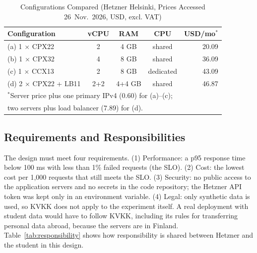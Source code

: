 \documentclass[conference,a4paper]{IEEEtran}
\begin{document}
\begin{table}[htbp]
	\caption{Configurations Compared (Hetzner Helsinki, Prices Accessed 26~Nov.~2026, USD, excl. VAT)}
	\label{tab:alternatives}
	\centering
	\footnotesize
	\setlength{\tabcolsep}{3pt}
	\begin{tabular}{|l|c|c|c|r|}
		\hline
		\textbf{Configuration} & \textbf{vCPU} & \textbf{RAM} & \textbf{CPU} & \textbf{USD/mo}$^*$ \\
		\hline
		(a) 1 $\times$ CPX22 & 2 & 4 GB & shared & 20.09 \\
		\hline
		(b) 1 $\times$ CPX32 & 4 & 8 GB & shared & 36.09 \\
		\hline
		(c) 1 $\times$ CCX13 & 2 & 8 GB & dedicated & 43.09 \\
		\hline
		(d) 2 $\times$ CPX22 + LB11 & 2+2 & 4+4 GB & shared & 46.87 \\
		\hline
		\multicolumn{5}{l}{$^*$Server price plus one primary IPv4 (0.60) for (a)--(c);} \\
		\multicolumn{5}{l}{\phantom{$^*$}two servers plus load balancer (7.89) for (d).} \\
	\end{tabular}
\end{table}

\subsection{Requirements and Responsibilities}

The design must meet four requirements. (1) Performance: a p95 response time below 100 ms with less than 1\% failed requests (the SLO). (2) Cost: the lowest cost per 1,000 requests that still meets the SLO. (3) Security: no public access to the application servers and no secrets in the code repository; the Hetzner API token was kept only in an environment variable. (4) Legal: only synthetic data is used, so KVKK does not apply to the experiment itself. A real deployment with student data would have to follow KVKK, including its rules for transferring personal data abroad, because the servers are in Finland. Table~\ref{tab:responsibility} shows how responsibility is shared between Hetzner and the student in this design.
\end{document}
